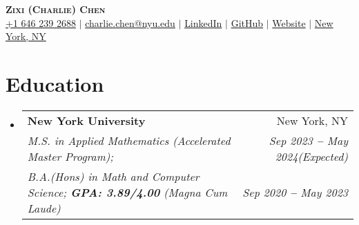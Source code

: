 \documentclass[letterpaper,11pt]{article}
\makeatletter
\newcommand{\resumeItem}[1]{
  \item\small{
    {#1 \vspace{-2pt}}
  }
}
\newcommand{\resumeEducationHeading}[6]{
  \vspace{-2pt}\item
    \begin{tabular*}{0.97\textwidth}[t]{l@{\extracolsep{\fill}}r}
      \textbf{#1} & #2 \\
      \textit{\small#3} & \textit{\small #4} \\
      \textit{\small#5} & \textit{\small #6} \\
    \end{tabular*}\vspace{-5pt}
}
\newcommand{\resumeSubHeadingListStart}{\begin{itemize}[leftmargin=0.15in, label={}]}
\newcommand{\resumeSubHeadingListEnd}{\end{itemize}}
\newcommand{\resumeItemListStart}{\begin{itemize}}
\newcommand{\resumeItemListEnd}{\end{itemize}\vspace{-5pt}}
\makeatother
\begin{document}

\begin{center}
    \textbf{\Huge \scshape Zixi (Charlie) Chen} \\ \vspace{3pt}
    \small
    \faMobile \hspace{.5pt} \href{tel:6462392688}{+1 646 239 2688}
    $|$
    \faAt \hspace{.5pt} \href{mailto:charlie.chen@nyu.edu}{charlie.chen@nyu.edu}
    $|$
    \faLinkedinSquare \hspace{.5pt} \href{https://www.linkedin.com/in/charliezxchen/}{LinkedIn}
    $|$
    \faGithub \hspace{.5pt} \href{https://github.com/charliezchen/}{GitHub}
    $|$
    \faGlobe \hspace{.5pt} \href{https://charliezchen.github.io/}{Website}
    $|$
    \faMapMarker \hspace{.5pt} \href{https://goo.gl/maps/8Rqa9jmpkqiD6akv5}{New York, NY}
\end{center}




\section{Education}
  \vspace{3pt}
  \resumeSubHeadingListStart
    
    \resumeEducationHeading
      {New York University}{New York, NY}
      {M.S. in Applied Mathematics (Accelerated Master Program);}{Sep 2023 \textbf{--} May 2024(Expected)}
      {B.A.(Hons) in Math and Computer Science;   \textbf{GPA: 3.89/4.00} (Magna Cum Laude)}{Sep 2020 \textbf{--} May 2023}
    
  \resumeSubHeadingListEnd


\end{document}
